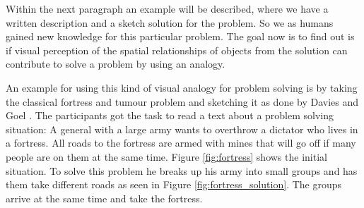 \documentclass[12pt]{article}
\begin{document}
Within the next paragraph an example will be described, where we have a written description and a sketch solution for the problem. So we as humans gained new knowledge for this particular problem. The goal now is to find out is if visual perception of the spatial relationships of objects from the solution can contribute to solve a problem by using an analogy. 

An example for using this kind of visual analogy for problem solving is by taking the classical fortress and tumour problem \cite{duncker1926qualitative} and sketching it as done by Davies and Goel \cite{davies2001visual}. The participants got the task to read a text about a problem solving situation: A general with a large army wants to overthrow a dictator who lives in a fortress. All roads to the fortress are armed with mines that will go off if many people are on them at the same time. Figure \ref{fig:fortress} shows the initial situation. To solve this problem he breaks up his army into small groups and has them take different roads as seen in Figure \ref{fig:fortress_solution}. The groups arrive at the same time and take the fortress.  
\end{document}

